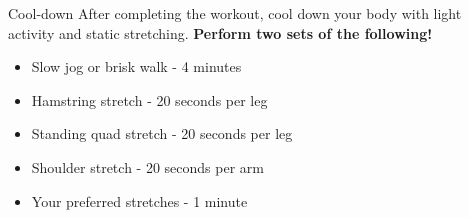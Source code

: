 \documentclass{article}
\newcounter{workout}
\begin{document}
\begin{tcolorbox}[colback=gray!15,colframe=black,enforce breakable,pad at break*=5mm,boxrule=0.5mm]
		\begin{workoutbox}{Cool-down}
			After completing the workout, cool down your body with light activity and static stretching. \textbf{Perform two sets of the following!}
			
			\begin{itemize}[label=\textcolor{blue!70}{\textbullet}, itemsep=0pt]
				\item Slow jog or brisk walk - 4 minutes
				\item Hamstring stretch - 20 seconds per leg
				\item Standing quad stretch - 20 seconds per leg
				\item Shoulder stretch - 20 seconds per arm
				\item Your preferred stretches - 1 minute
			\end{itemize}
		\end{workoutbox}
		
	\end{tcolorbox}
	
\end{document}
